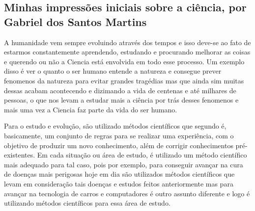 \subsection{Minhas impressões iniciais sobre a ciência, por Gabriel dos Santos Martins}

A humanidade vem sempre evoluindo através dos tempos e isso deve-se ao fato de estarmos constantemente aprendendo, estudando e procurando melhorar as coisas e querendo ou não a \gls{Ciencia} está envolvida em todo esse processo. Um exemplo disso é ver o quanto o ser humano entende a natureza e consegue prever \gls{fenomeno}s da natureza para evitar grandes tragédias mas que ainda sim muitas dessas acabam acontecendo e dizimando a vida de centenas e até milhares de pessoas, o que nos levam a estudar mais a ciência por trás desses \gls{fenomeno}s e mais uma vez a \gls{Ciencia} faz parte da vida do ser humano. 

Para o estudo e evolução, são utilizado métodos científicos que segundo \citep{gnipper_o_nodate} é, basicamente, um conjunto de regras para se realizar uma experiência, com o objetivo de produzir um novo conhecimento, além de corrigir conhecimentos pré-existentes.
Em cada situação ou área de estudo, é utilizado um método científico mais adequado para tal caso, pois por exemplo, para conseguir avançar na cura de doenças mais perigosas hoje em dia são utilizados métodos científicos que levam em consideração tais doenças e estudos feitos anteriormente mas para avançar na tecnologia de carros e computadores é outro assunto diferente e logo é utilizando métodos científicos para essa área de estudo. 